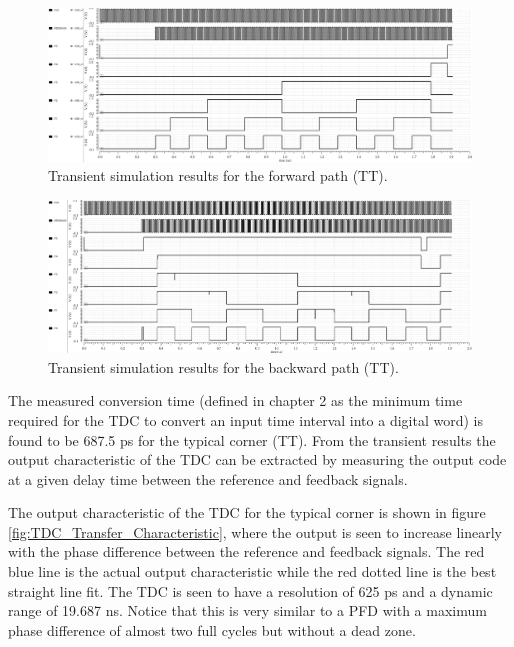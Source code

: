 \begin{figure}[H]
    \centering
    \includegraphics[width=1\textwidth]{figures/TDC_TRAN_fwd.png}
    \caption{Transient simulation results for the forward path (TT).}
    \label{fig:TDC_TRAN_fwd}
\end{figure}

\begin{figure}[H]
    \centering
    \includegraphics[width=1\textwidth]{figures/TDC_TRAN_bwd.png}
    \caption{Transient simulation results for the backward path (TT).}
    \label{fig:TDC_TRAN_bwd}
\end{figure}

The measured conversion time (defined in chapter 2 as the minimum time required for the TDC to convert an input time interval into a digital word) is found to be 687.5 ps for the typical corner (TT). From the
transient results the output characteristic of the TDC can be extracted by measuring the output code at a given delay time between the reference and feedback signals.

The output characteristic of the TDC for the typical corner is shown in figure \ref{fig:TDC_Transfer_Characteristic}, where the output is seen to increase linearly with the phase difference between the
reference and feedback signals. The red blue line is the actual output characteristic while the red dotted line is the best straight line fit. The TDC is seen to have a resolution of 625 ps and a dynamic
range of 19.687 ns. Notice that this is very similar to a PFD with a maximum phase difference of almost two full cycles but without a dead zone.

